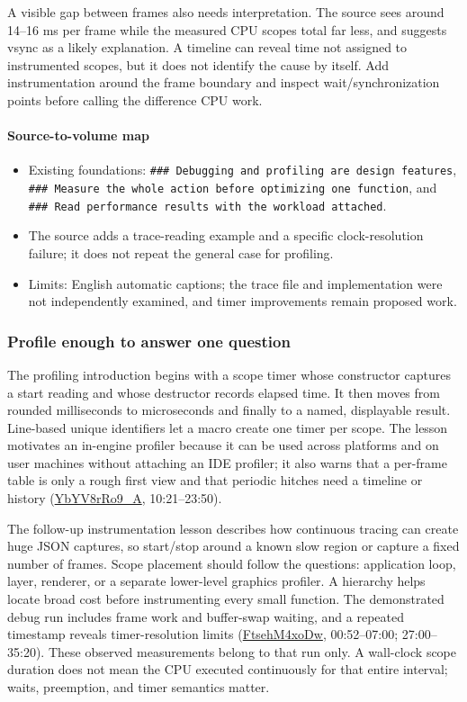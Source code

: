 A visible gap between frames also needs interpretation. The source sees around 14--16 ms per frame while the measured CPU scopes total far less, and suggests vsync as a likely explanation. A timeline can reveal time not assigned to instrumented scopes, but it does not identify the cause by itself. Add instrumentation around the frame boundary and inspect wait/synchronization points before calling the difference CPU work.

\paragraph{Source-to-volume map}\label{source-to-volume-map-1}

\begin{itemize}
\tightlist
\item
  Existing foundations: \texttt{\#\#\#\ Debugging\ and\ profiling\ are\ design\ features}, \texttt{\#\#\#\ Measure\ the\ whole\ action\ before\ optimizing\ one\ function}, and \texttt{\#\#\#\ Read\ performance\ results\ with\ the\ workload\ attached}.
\item
  The source adds a trace-reading example and a specific clock-resolution failure; it does not repeat the general case for profiling.
\item
  Limits: English automatic captions; the trace file and implementation were not independently examined, and timer improvements remain proposed work.
\end{itemize}

\subsubsection{Profile enough to answer one question}\label{profile-enough-to-answer-one-question}

The profiling introduction begins with a scope timer whose constructor captures a start reading and whose destructor records elapsed time. It then moves from rounded milliseconds to microseconds and finally to a named, displayable result. Line-based unique identifiers let a macro create one timer per scope. The lesson motivates an in-engine profiler because it can be used across platforms and on user machines without attaching an IDE profiler; it also warns that a per-frame table is only a rough first view and that periodic hitches need a timeline or history (\href{https://www.youtube.com/watch?v=YbYV8rRo9_A}{YbYV8rRo9\_A}, 10:21--23:50).

The follow-up instrumentation lesson describes how continuous tracing can create huge JSON captures, so start/stop around a known slow region or capture a fixed number of frames. Scope placement should follow the questions: application loop, layer, renderer, or a separate lower-level graphics profiler. A hierarchy helps locate broad cost before instrumenting every small function. The demonstrated debug run includes frame work and buffer-swap waiting, and a repeated timestamp reveals timer-resolution limits (\href{https://www.youtube.com/watch?v=FtsehM4xoDw}{FtsehM4xoDw}, 00:52--07:00; 27:00--35:20). These observed measurements belong to that run only. A wall-clock scope duration does not mean the CPU executed continuously for that entire interval; waits, preemption, and timer semantics matter.

